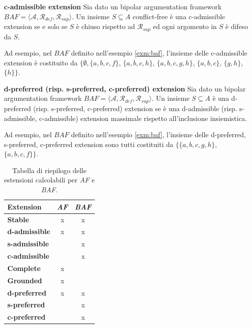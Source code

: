 \bigskip
\begin{defn} \textbf{c-admissible extension}
Sia dato un bipolar argumentation framework $BAF = ⟨\mathcal{A}, \mathcal{R}_{def}, \mathcal{R}_{sup}⟩$. Un insieme $S \subseteq A$ conflict-free è una c-admissible extension se e solo se $S$ è chiuso rispetto ad $\mathcal{R}_{sup}$ ed ogni argomento in $S$ è difeso da $S$.
\end{defn}

Ad esempio, nel $BAF$ definito nell'esempio \ref{exm:baf}, l'insieme delle c-admissible extension è costituito da $\{∅, \{a, b, c, f \}$, $\{a, b, c, h\}$, $\{a, b, c, g, h\}$, $\{a, b, c\}$, $\{g, h\}$, $\{h\}\}$.


\bigskip
\begin{defn} \textbf{d-preferred (risp. s-preferred, c-preferred) extension}
Sia dato un bipolar argumentation framework $BAF = ⟨\mathcal{A}, \mathcal{R}_{def}, \mathcal{R}_{sup}⟩$. Un insieme $S \subseteq A$ è una d-preferred (risp. s-preferred, c-preferred) extension se è una d-admissible (risp. s-admissible, c-admissible) extension massimale rispetto all'inclusione insiemistica.
\end{defn}

Ad esempio, nel $BAF$ definito nell'esempio \ref{exm:baf}, l'insieme delle d-preferred, s-preferred, c-preferred extension sono tutti costituiti da $\{\{a,b,c,g,h\}$, \\ $\{a,b,c,f\}\}$.



\begin{table}[H]
    \centering
    \begin{tabular}{|l|c|c|}
        \hline
        \textbf{Extension} & \textbf{\textit{AF}} & \textit{\textbf{BAF}} \\ \hline
        \textbf{Stable}       & x & x \\ \hline
        \textbf{d-admissible} & x & x \\ \hline
        \textbf{s-admissible} &   & x \\ \hline
        \textbf{c-admissible} &   & x \\ \hline
        \textbf{Complete}     & x &   \\ \hline
        \textbf{Grounded}     & x &   \\ \hline
        \textbf{d-preferred}  & x & x \\ \hline
        \textbf{s-preferred}  &   & x \\ \hline
        \textbf{c-preferred}  &   & x \\ \hline
    \end{tabular}
    \caption{Tabella di riepilogo delle estensioni calcolabili per \textit{AF} e \textit{BAF}.}
\end{table}


